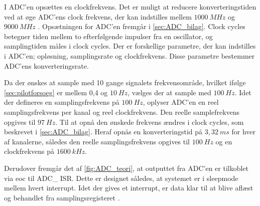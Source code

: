 I ADC'en opsættes en clockfrekvens. 
Det er muligt at reducere konverteringstiden ved at øge ADC'ens clock frekvens, der kan indstilles mellem $1000~MHz$ og $9000~MHz$ \citep{ADC2014}. 
Opsætningen for ADC'en fremgår i \autoref{sec:ADC_bilag}. 
Clock cycles betegner tiden mellem to efterfølgende impulser fra en oscillator, og samplingtiden måles i clock cycles. 
Der er forskellige parametre, der kan indstilles i ADC'en; opløsning, samplingsrate og clockfrekvens. 
Disse parametre bestemmer ADC'ens konverteringsrate. %

Da der ønskes at sample med 10 gange signalets frekvensområde, hvilket ifølge \autoref{sec:pilotforsoeg} er mellem 0,4 og $10~Hz$, vælges der at sample med $100~Hz$. 
Idet der defineres en samplingsfrekvens på $100~Hz$, oplyser ADC'en en reel samplingsfrekvens per kanal og reel clockfrekvens. 
Den reelle samplefrekvens opgives til $97~Hz$. Til at opnå den ønskede frekvens ændres i clock cycles, som beskrevet i \autoref{sec:ADC_bilag}.
Heraf opnås en konverteringstid på $3,32~ms$ for hver af kanalerne, således den reelle samplingsfrekvens opgives til $100~Hz$ og en clockfrekvens på $1600~kHz$. 

Derudover fremgår det af \autoref{fig:ADC_teori}, at outputtet fra ADC'en er tilkoblet via eoc til ADC\_ ISR. Dette er designet således, at systemet er i sleepmode mellem hvert interrupt. Idet der gives et interrupt, er data klar til at blive aflæst og behandlet fra samplingsregisteret \citep{ADC2014}.


